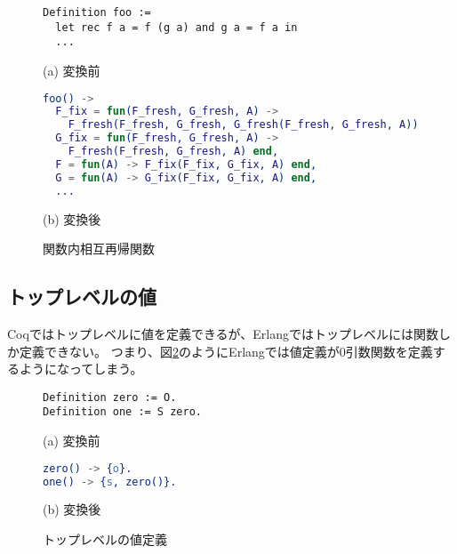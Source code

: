 \begin{figure}\centering
\begin{minipage}{1\textwidth}\centering
\begin{lstlisting}[frame=single,numbers=none,xleftmargin=0pt]
Definition foo :=
  let rec f a = f (g a) and g a = f a in
  ...
\end{lstlisting}
(a) 変換前
\end{minipage}
\begin{minipage}{1\textwidth}\centering
\begin{lstlisting}[frame=single,numbers=none,xleftmargin=0pt,language=Erlang]
foo() ->
  F_fix = fun(F_fresh, G_fresh, A) ->
    F_fresh(F_fresh, G_fresh, G_fresh(F_fresh, G_fresh, A)) end,
  G_fix = fun(F_fresh, G_fresh, A) ->
    F_fresh(F_fresh, G_fresh, A) end,
  F = fun(A) -> F_fix(F_fix, G_fix, A) end,
  G = fun(A) -> G_fix(F_fix, G_fix, A) end,
  ...
\end{lstlisting}
(b) 変換後
\end{minipage}
\label{code:extraction:recursive}
\caption{関数内相互再帰関数}
\end{figure}

\subsection{トップレベルの値}

Coqではトップレベルに値を定義できるが、Erlangではトップレベルには関数しか定義できない。
つまり、図\ref{code:extraction:toplevel-value-impossible}のようにErlangでは値定義が0引数関数を定義するようになってしまう。

\begin{figure}\centering
\begin{minipage}{0.4\textwidth}\centering
\begin{lstlisting}[frame=single,numbers=none,xleftmargin=0pt]
Definition zero := O.
Definition one := S zero.
\end{lstlisting}
(a) 変換前
\end{minipage}
\hspace*{3ex}
\begin{minipage}{0.4\textwidth}\centering
\begin{lstlisting}[frame=single,numbers=none,xleftmargin=0pt,language=Erlang]
zero() -> {o}.
one() -> {s, zero()}.
\end{lstlisting}
(b) 変換後
\end{minipage}
\label{code:extraction:toplevel-value-impossible}
\caption{トップレベルの値定義}
\end{figure}

